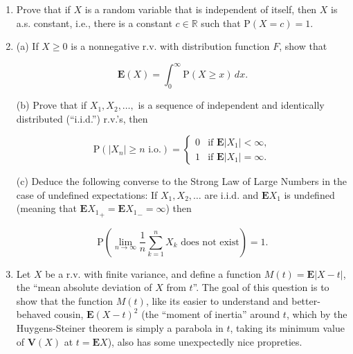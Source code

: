 \documentclass[11pt]{report}
\newcommand{\R}{\mathbb{R}}
\theoremstyle{plain}
\theoremstyle{definition}
\begin{document}
\begin{enumerate}[label=\arabic*.]
(c) Use the same ``discrete convolution'' formula to
prove directly that if
$X \sim \operatorname{Bin}(n,p)$ and
$Y\sim \operatorname{Bin}(m,p)$ are independent then
$X+Y \sim \operatorname{Bin}(n+m,p)$. You may make
use of the combinatorial identity (known as the
Vandermonde identity or Chu-Vandermonde identity)

\[
\sum_{j=0}^k \binom{n}{j} \binom{m}{k-j} = \binom{n+m}{k}, \qquad (n,m\ge 0,\ 0\le k\le n+m).
\]

\noindent As a bonus, try to find a direct combinatorial proof
for this identity. An amusing version of the answer
can be found at \href{http://en.wikipedia.org/wiki/Vandermonde's_identity}{the Wikipedia article on
Vandermonde's
identity}.

\item Prove that if $X$ is a random variable that is
independent of itself, then $X$ is a.s. constant,
i.e., there is a constant $c\in\R$ such that
$\mathrm{P}(X=c)=1$.

\item (a) If $X\ge 0$ is a nonnegative r.v. with
distribution function $F$, show that

\[
\mathbf{E}(X)=\int_0^\infty \mathrm{P}(X\ge x)\,dx.
\]

\noindent (b) Prove that if $X_1, X_2, \ldots,$ is a sequence
of independent and identically distributed
(``i.i.d.'') r.v.'s, then

\[
\mathrm{P}(|X_n|\ge n\textrm{ i.o.})=\begin{cases} 0 & \textrm{if }\mathbf{E}|X_1|<\infty, \\
1 & \textrm{if }\mathbf{E}|X_1|=\infty. \end{cases}
\]

\noindent (c) Deduce the following converse to the Strong Law
of Large Numbers in the case of undefined
expectations: If $X_1,X_2,\ldots$ are i.i.d. and
$\mathbf{E} X_1$ is undefined (meaning that
$\mathbf{E} {X_1}_+ = \mathbf{E} {X_1}_- = \infty$)
then

\[
\mathrm{P}\left( \lim_{n\to\infty} \frac{1}{n}\sum_{k=1}^n X_k\textrm{ does not exist} \right) = 1.
\]

\item Let $X$ be a r.v. with finite variance, and define a
function $M(t)=\mathbf{E}|X-t|$, the ``mean absolute
deviation of $X$ from $t$''. The goal of this
question is to show that the function $M(t)$, like
its easier to understand and better-behaved cousin,
$\mathbf{E}(X-t)^2$ (the ``moment of inertia'' around
$t$, which by the Huygens-Steiner theorem is simply a
parabola in $t$, taking its minimum value of
$\mathbf{V}(X)$ at $t=\mathbf{E} X$), also has some
unexpectedly nice propreties.


\end{enumerate}
\end{document}
